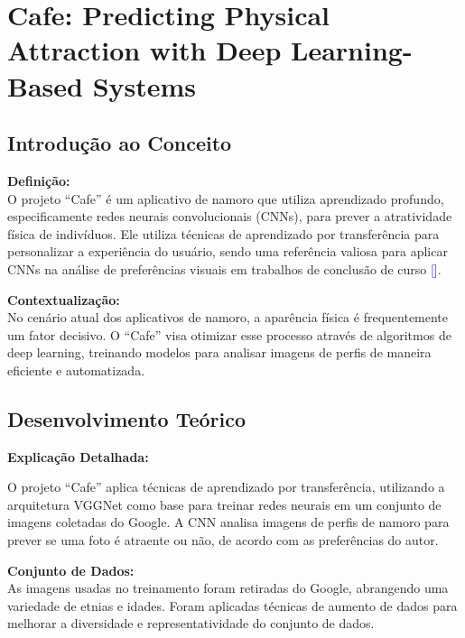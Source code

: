 \section{Cafe: Predicting Physical Attraction with Deep Learning-Based Systems}

\subsection{Introdução ao Conceito}

\textbf{Definição:} \\
O projeto ``Cafe'' é um aplicativo de namoro que utiliza aprendizado profundo, especificamente redes neurais convolucionais (CNNs), para prever a atratividade física de indivíduos. Ele utiliza técnicas de aprendizado por transferência para personalizar a experiência do usuário, sendo uma referência valiosa para aplicar CNNs na análise de preferências visuais em trabalhos de conclusão de curso \textcolor{blue}{[\cite{DesiPilla}]}.

\textbf{Contextualização:} \\
No cenário atual dos aplicativos de namoro, a aparência física é frequentemente um fator decisivo. O ``Cafe'' visa otimizar esse processo através de algoritmos de deep learning, treinando modelos para analisar imagens de perfis de maneira eficiente e automatizada.

\subsection{Desenvolvimento Teórico}

\textbf{Explicação Detalhada:}

O projeto ``Cafe'' aplica técnicas de aprendizado por transferência, utilizando a arquitetura VGGNet como base para treinar redes neurais em um conjunto de imagens coletadas do Google. A CNN analisa imagens de perfis de namoro para prever se uma foto é atraente ou não, de acordo com as preferências do autor.



\textbf{Conjunto de Dados:} \\
As imagens usadas no treinamento foram retiradas do Google, abrangendo uma variedade de etnias e idades. Foram aplicadas técnicas de aumento de dados para melhorar a diversidade e representatividade do conjunto de dados.

